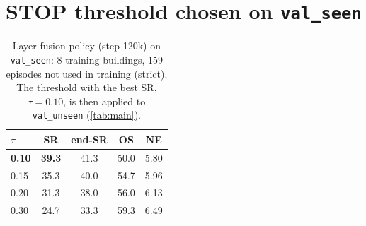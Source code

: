 \documentclass[11pt]{article}
\begin{document}
\section{STOP threshold chosen on \texttt{val\_seen}}
\label{app:valseen}
\begin{table}[H]
\centering\small
\caption{Layer-fusion policy (step 120k) on \texttt{val\_seen}: 8 training buildings, 159 episodes not used in training
(strict). The threshold with the best SR, $\tau{=}0.10$, is then applied to \texttt{val\_unseen} (\cref{tab:main}).}
\begin{tabular}{lcccc}
\toprule
$\tau$ & SR & end-SR & OS & NE \\
\midrule
\textbf{0.10} & \textbf{39.3} & 41.3 & 50.0 & 5.80 \\
0.15 & 35.3 & 40.0 & 54.7 & 5.96 \\
0.20 & 31.3 & 38.0 & 56.0 & 6.13 \\
0.30 & 24.7 & 33.3 & 59.3 & 6.49 \\
\bottomrule
\end{tabular}
\end{table}
\end{document}
